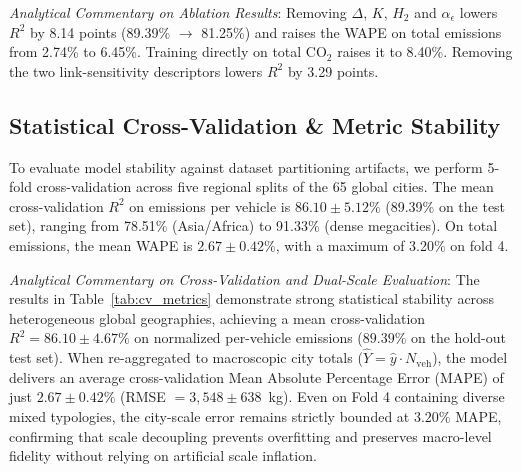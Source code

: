 \documentclass[journal]{IEEEtran}
\begin{document}
\textit{Analytical Commentary on Ablation Results}:
Removing $\Delta$, $K$, $H_2$ and $\alpha_\epsilon$ lowers $R^2$ by 8.14 points (89.39\% $\to$ 81.25\%) and raises the WAPE on total emissions from 2.74\% to 6.45\%. Training directly on total $\text{CO}_2$ raises it to 8.40\%. Removing the two link-sensitivity descriptors lowers $R^2$ by 3.29 points.

\subsection{Statistical Cross-Validation \& Metric Stability}
To evaluate model stability against dataset partitioning artifacts, we perform 5-fold cross-validation across five regional splits of the 65 global cities. The mean cross-validation $R^2$ on emissions per vehicle is $86.10 \pm 5.12\%$ (89.39\% on the test set), ranging from 78.51\% (Asia/Africa) to 91.33\% (dense megacities). On total emissions, the mean WAPE is $2.67 \pm 0.42\%$, with a maximum of 3.20\% on fold 4.

\begin{table}[htbp]
\caption{5-Fold Cross-Validation Metrics Across Grouped Regional Metropolitan Splits}
\label{tab:cv_metrics}
\centering
{}
\end{table}

\textit{Analytical Commentary on Cross-Validation and Dual-Scale Evaluation}:
The results in Table~\ref{tab:cv_metrics} demonstrate strong statistical stability across heterogeneous global geographies, achieving a mean cross-validation $R^2 = 86.10 \pm 4.67\%$ on normalized per-vehicle emissions ($89.39\%$ on the hold-out test set). When re-aggregated to macroscopic city totals ($\hat{Y} = \hat{y} \cdot N_{\text{veh}}$), the model delivers an average cross-validation Mean Absolute Percentage Error (MAPE) of just $2.67 \pm 0.42\%$ (RMSE $= 3,548 \pm 638$~kg). Even on Fold 4 containing diverse mixed typologies, the city-scale error remains strictly bounded at $3.20\%$ MAPE, confirming that scale decoupling prevents overfitting and preserves macro-level fidelity without relying on artificial scale inflation.
\end{document}
